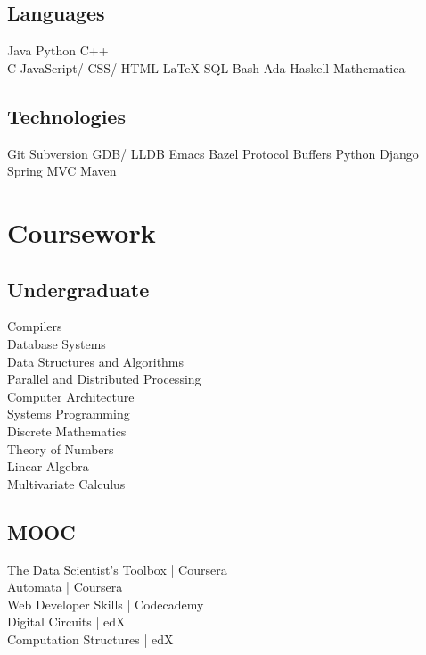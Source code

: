 \documentclass[letterpaper]{deedy-resume} %
\begin{document}
\begin{minipage}[t]{0.33\textwidth}
\subsection{Languages}

Java \textbullet{} Python \textbullet{} C++\\ 
C \textbullet{} JavaScript/ CSS/ HTML \textbullet{} \LaTeX \textbullet{} SQL Bash \textbullet{} Ada \textbullet{} Haskell \textbullet{} Mathematica
\sectionspace

\subsection{Technologies}
Git \textbullet{} Subversion \textbullet{} GDB/ LLDB \textbullet{} Emacs Bazel \textbullet{} Protocol Buffers \textbullet{} Python Django Spring MVC \textbullet{} Maven 
\sectionspace %


\section{Coursework}

\subsection{Undergraduate}

Compilers \\
Database Systems \\
Data Structures and Algorithms \\
Parallel and Distributed Processing \\
Computer Architecture \\
Systems Programming \\
Discrete Mathematics \\
Theory of Numbers \\
Linear Algebra \\
Multivariate Calculus

\sectionspace %

\subsection{MOOC}

The Data Scientist's Toolbox | Coursera \\
Automata | Coursera \\
Web Developer Skills | Codecademy \\
Digital Circuits | edX \\
Computation Structures | edX

\sectionspace


\end{minipage} %
\end{document}
